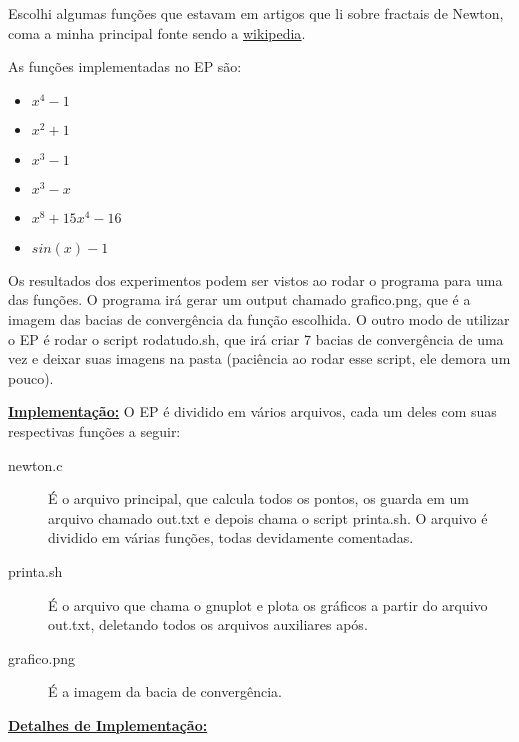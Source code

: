 \documentclass[12pt]{article}
\newcommand{\mytitle}[1]{\textbf{\underline{#1}}}
\begin{document}
Escolhi algumas funções que estavam em artigos que li sobre fractais de Newton, coma a minha principal fonte sendo a \underline{\href{https://en.wikipedia.org/wiki/Newton\_fractal}{wikipedia}}.

As funções implementadas no EP são:


\begin{itemize}
  
\item  $x^4 - 1$
\item  $x^2 + 1$
\item  $x^3 - 1$
\item  $x^3 - x$
\item  $x^8 + 15x^4 - 16$
\item  $sin(x) - 1$
  
\end{itemize}


Os resultados dos experimentos podem ser vistos ao rodar o programa para uma das funções. O programa irá gerar um output chamado grafico.png, que é a imagem das bacias de convergência da função escolhida. O outro modo de utilizar o EP é rodar o script rodatudo.sh, que irá criar 7 bacias de convergência de uma vez e deixar suas imagens na pasta (paciência ao rodar esse script, ele demora um pouco).

\mytitle{Implementação:} O EP é dividido em vários arquivos, cada um deles com suas respectivas funções a seguir:

\begin{description}
  
\item[newton.c] É o arquivo principal, que calcula todos os pontos, os guarda em um arquivo chamado out.txt e depois chama o script printa.sh. O arquivo é dividido em várias funções, todas devidamente comentadas.
\item[printa.sh] É o arquivo que chama o gnuplot e plota os gráficos a partir do arquivo out.txt, deletando todos os arquivos auxiliares após.
\item[grafico.png] É a imagem da bacia de convergência.
  
\end{description}

\mytitle{Detalhes de Implementação:}
\end{document}
